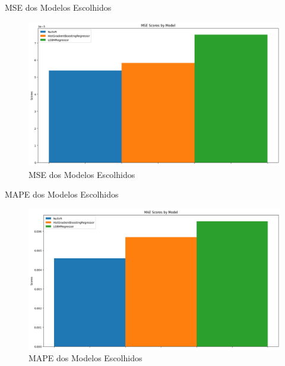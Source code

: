 \documentclass{beamer}
\begin{document}
\begin{frame}{MSE dos Modelos Escolhidos}
    \begin{figure}[H]
        \centering
        \includegraphics[width=1\linewidth]{7.png}
        \caption{MSE dos Modelos Escolhidos}
    \end{figure}
\end{frame}

\begin{frame}{MAPE dos Modelos Escolhidos}
    \begin{figure}[H]
        \centering
        \includegraphics[width=1\linewidth]{9.png}
        \caption{MAPE dos Modelos Escolhidos}
    \end{figure}
\end{frame}
\end{document}
